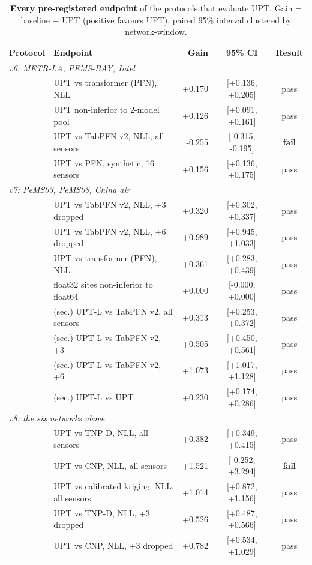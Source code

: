 \begin{table}[h]\centering\scriptsize
\caption{\textbf{Every pre-registered endpoint} of the protocols that evaluate UPT. Gain = baseline $-$ UPT (positive favours UPT), paired 95\% interval clustered by network-window.}
\label{tab:all-endpoints}
\begin{tabular}{llrcc}
\toprule
Protocol & Endpoint & Gain & 95\% CI & Result \\
\midrule
\multicolumn{5}{l}{\emph{v6: METR-LA, PEMS-BAY, Intel}} \\
 & UPT vs transformer (PFN), NLL & +0.170 & [+0.136, +0.205] & pass \\
 & UPT non-inferior to 2-model pool & +0.126 & [+0.091, +0.161] & pass \\
 & UPT vs TabPFN v2, NLL, all sensors & -0.255 & [-0.315, -0.195] & \textbf{fail} \\
 & UPT vs PFN, synthetic, 16 sensors & +0.156 & [+0.136, +0.175] & pass \\
\multicolumn{5}{l}{\emph{v7: PeMS03, PeMS08, China air}} \\
 & UPT vs TabPFN v2, NLL, +3 dropped & +0.320 & [+0.302, +0.337] & pass \\
 & UPT vs TabPFN v2, NLL, +6 dropped & +0.989 & [+0.945, +1.033] & pass \\
 & UPT vs transformer (PFN), NLL & +0.361 & [+0.283, +0.439] & pass \\
 & float32 sites non-inferior to float64 & +0.000 & [-0.000, +0.000] & pass \\
 & (sec.) UPT-L vs TabPFN v2, all sensors & +0.313 & [+0.253, +0.372] & pass \\
 & (sec.) UPT-L vs TabPFN v2, +3 & +0.505 & [+0.450, +0.561] & pass \\
 & (sec.) UPT-L vs TabPFN v2, +6 & +1.073 & [+1.017, +1.128] & pass \\
 & (sec.) UPT-L vs UPT & +0.230 & [+0.174, +0.286] & pass \\
\multicolumn{5}{l}{\emph{v8: the six networks above}} \\
 & UPT vs TNP-D, NLL, all sensors & +0.382 & [+0.349, +0.415] & pass \\
 & UPT vs CNP, NLL, all sensors & +1.521 & [-0.252, +3.294] & \textbf{fail} \\
 & UPT vs calibrated kriging, NLL, all sensors & +1.014 & [+0.872, +1.156] & pass \\
 & UPT vs TNP-D, NLL, +3 dropped & +0.526 & [+0.487, +0.566] & pass \\
 & UPT vs CNP, NLL, +3 dropped & +0.782 & [+0.534, +1.029] & pass \\

\end{tabular}
\end{table}
